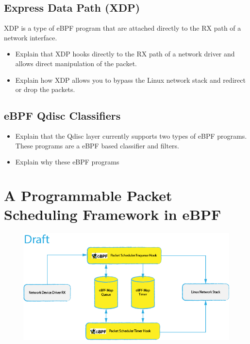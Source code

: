 \documentclass[sigconf, nonacm]{acmart}
\begin{document}
\subsection{Express Data Path (XDP)}

XDP is a type of eBPF program that are attached directly to the RX path of a
network interface.

\begin{itemize}
  \item Explain that XDP hooks directly to the RX path of a network driver and allows direct manipulation of the packet.
  \item Explain how XDP allows you to bypass the Linux network stack and redirect or drop the packets.
\end{itemize}


\subsection{eBPF Qdisc Classifiers}

\begin{itemize}
  \item Explain that the Qdisc layer currently supports two types of eBPF programs. These programs are a eBPF based classifier and filters.
  \item Explain why these eBPF programs
\end{itemize}


\section{A Programmable Packet Scheduling Framework in eBPF}

\begin{figure}
  \includegraphics[width=\linewidth]{ebpf_pps_flow.png} %
  \label{fig:ebpf_pps_flow}
\end{figure}
\end{document}

